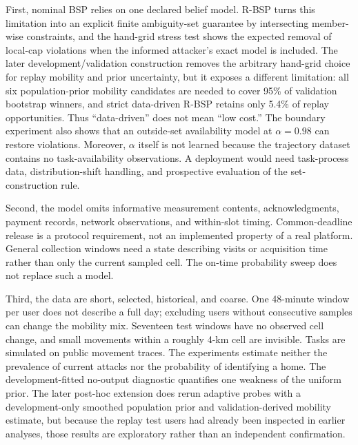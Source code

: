 \documentclass[review,11pt,times]{elsarticle}
\begin{document}
First, nominal BSP relies on one declared belief model. R-BSP turns this limitation into an explicit finite ambiguity-set guarantee by intersecting member-wise constraints, and the hand-grid stress test shows the expected removal of local-cap violations when the informed attacker's exact model is included. The later development/validation construction removes the arbitrary hand-grid choice for replay mobility and prior uncertainty, but it exposes a different limitation: all six population-prior mobility candidates are needed to cover 95\% of validation bootstrap winners, and strict data-driven R-BSP retains only 5.4\% of replay opportunities. Thus ``data-driven'' does not mean ``low cost.'' The boundary experiment also shows that an outside-set availability model at $\alpha=0.98$ can restore violations. Moreover, $\alpha$ itself is not learned because the trajectory dataset contains no task-availability observations. A deployment would need task-process data, distribution-shift handling, and prospective evaluation of the set-construction rule.

Second, the model omits informative measurement contents, acknowledgments, payment records, network observations, and within-slot timing. Common-deadline release is a protocol requirement, not an implemented property of a real platform. General collection windows need a state describing visits or acquisition time rather than only the current sampled cell. The on-time probability sweep does not replace such a model.

Third, the data are short, selected, historical, and coarse. One 48-minute window per user does not describe a full day; excluding users without consecutive samples can change the mobility mix. Seventeen test windows have no observed cell change, and small movements within a roughly 4-km cell are invisible. Tasks are simulated on public movement traces. The experiments estimate neither the prevalence of current attacks nor the probability of identifying a home. The development-fitted no-output diagnostic quantifies one weakness of the uniform prior. The later post-hoc extension does rerun adaptive probes with a development-only smoothed population prior and validation-derived mobility estimate, but because the replay test users had already been inspected in earlier analyses, those results are exploratory rather than an independent confirmation.
\end{document}
